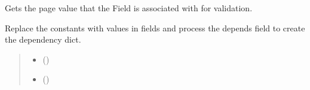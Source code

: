 \documentclass[letterpaper,10pt,english]{sphinxmanual}
\begin{document}
\begin{fulllineitems}
\begin{fulllineitems}
\label{\detokenize{apache_commons_validator_python:apache_commons_validator_python.field_new.Field.page}}
\pysigstartsignatures
{}
\pysigstopsignatures
\sphinxAtStartPar
Gets the page value that the Field is associated with for validation.

\end{fulllineitems}


\begin{fulllineitems}
\label{\detokenize{apache_commons_validator_python:apache_commons_validator_python.field_new.Field.process}}
\pysigstartsignatures
{}
\pysigstopsignatures
\sphinxAtStartPar
Replace the constants with values in fields and process the depends field to
create the dependency dict.
\begin{quote}\begin{description}
\begin{itemize}
\item {} 
\sphinxAtStartPar
{} (\sphinxstyleliteralemphasis{\sphinxupquote{{[}}}\sphinxstyleliteralemphasis{\sphinxupquote{, }}\sphinxstyleliteralemphasis{\sphinxupquote{{]}}})

\item {} 
\sphinxAtStartPar
{} (\sphinxstyleliteralemphasis{\sphinxupquote{{[}}}\sphinxstyleliteralemphasis{\sphinxupquote{, }}\sphinxstyleliteralemphasis{\sphinxupquote{{]}}})


\end{itemize}
\end{description}
\end{quote}
\end{fulllineitems}
\end{fulllineitems}
\end{document}

